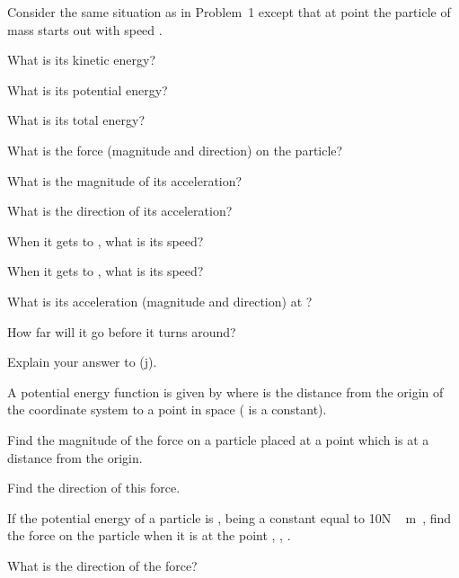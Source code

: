 {\begin{one-digit-list}
\item [2.] Consider the same situation as in Problem~1 except that at point
 the particle of mass  starts out with speed .
\begin{one-digit-list}
\item [a.] What is its kinetic energy? 
\item [b.] What is its potential energy? 
\item [c.] What is its total energy? 
\item [d.] What is the force (magnitude and direction) on the particle? 
\item [e.] What is the magnitude of its acceleration? 
\item [f.] What is the direction of its acceleration? 
\item [g.] When it gets to , what is its speed? 
\item [h.] When it gets to , what is its speed? 
\item [i.] What is its acceleration (magnitude and direction) at ? 
\item [j.] How far will it go before it turns around? 
\item [k.] Explain your answer to (j). 
\end{one-digit-list}

\item [3.] A potential energy function is given by 
where  is the distance from the origin of the coordinate system to a point
in space ( is a constant).
\begin{one-digit-list}
\item [a.] Find the magnitude of the force on a particle placed at a point
which is at a distance  from the origin. 
\item [b.] Find the direction of this force. 
\end{one-digit-list}

\item [4.] \NullItem
\begin{one-digit-list}
\item [a.] If the potential energy of a particle is ,  being
a constant equal to 10\unit{N\,m}, find the force on the particle when it is
at the point , , . 
\item [b.] What is the direction of the force? 
\end{one-digit-list}
\end{one-digit-list}

}
